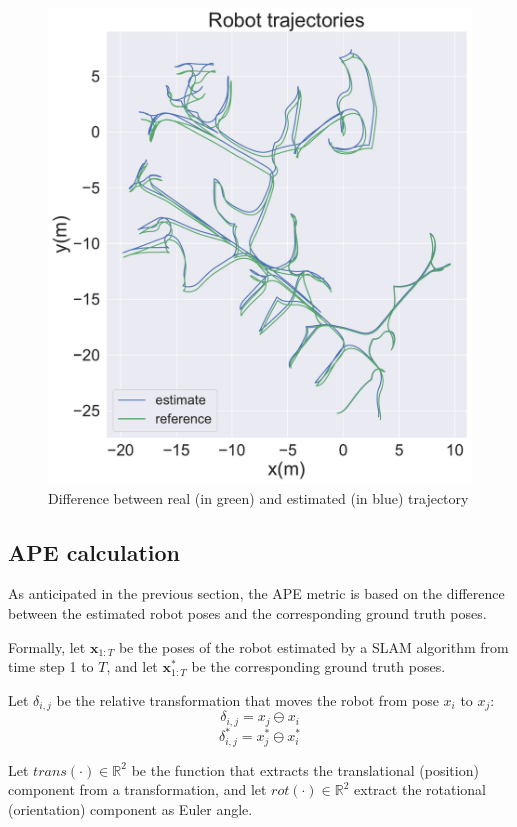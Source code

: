 \documentclass[a4paper]{article}
\begin{document}
\begin{figure}[htbp]
\begin{minipage}{0.48\textwidth}
        \includegraphics[width=\linewidth]{figures/trajectories.pdf}
        \caption{Difference between real (in green) and estimated (in blue) trajectory}
        \label{fig:trajectories}
    \end{minipage}
\end{figure}

\subsection{APE calculation}
As anticipated in the previous section, the APE metric is based on the difference between the estimated robot 
poses and the corresponding ground truth poses. 

Formally, let $\bm{x}_{1:T}$ be the poses of the robot estimated by
a SLAM algorithm from time step 1 to $T$, and let $\bm{x}^*_{1:T}$ be the corresponding ground truth poses.

Let $\delta_{i,j}$ be the relative transformation that moves the robot from pose $x_i$ to $x_j$:
$$ \delta_{i,j}=x_j\ominus x_i $$
$$ \delta^*_{i,j}=x^*_j\ominus x^*_i $$ 

Let $trans(\cdot)\in\mathbb{R}^2$ be the function that extracts the translational (position) component from a 
transformation, and let $rot(\cdot)\in\mathbb{R}^2$ extract the rotational (orientation) component as Euler angle.
\end{document}
